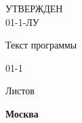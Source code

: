 
\begin{flushleft}
\begin{varwidth}{\linewidth}\centering
	\large
	УТВЕРЖДЕН \\
	{\docId} 01-1-ЛУ
\end{varwidth}
\end{flushleft}

\vskip4cm

{\Large\uppercase{\docTitle}}

\vskip1cm

{\large
	Текст программы

	{\docId} 01-1
}

\vskip1cm

Листов \pageref*{LastPage}

\vfill
\textbf{Москва \YEAR}